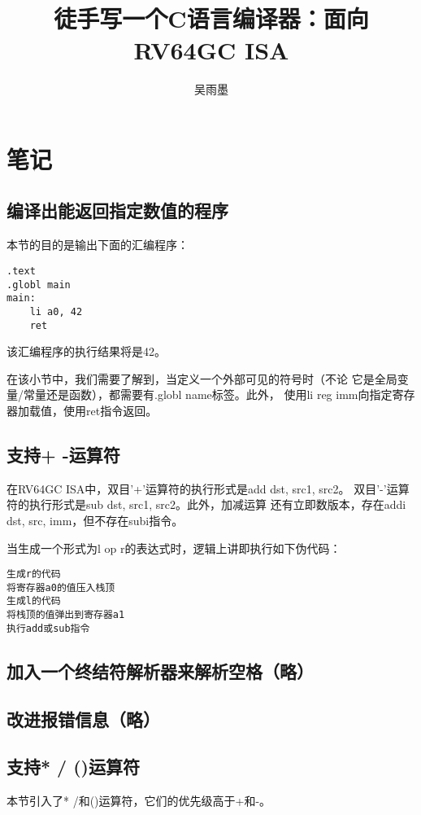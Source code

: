 \documentclass[a4paper, oneside, twocolumn]{ctexbook}
\begin{document}
\author{吴雨墨}
\title{徒手写一个C语言编译器：面向RV64GC ISA}
\maketitle

\tableofcontents

\chapter{笔记}
\section{编译出能返回指定数值的程序}
本节的目的是输出下面的汇编程序：

\begin{lstlisting}
.text
.globl main
main:
    li a0, 42
    ret
\end{lstlisting}  
该汇编程序的执行结果将是42。

在该小节中，我们需要了解到，当定义一个外部可见的符号时（不论
它是全局变量/常量还是函数），都需要有.globl name标签。此外，
使用li reg imm向指定寄存器加载值，使用ret指令返回。

\section{支持+ -运算符}
在RV64GC ISA中，双目'+'运算符的执行形式是add dst, src1, src2。
双目'-'运算符的执行形式是sub dst, src1, src2。此外，加减运算
还有立即数版本，存在addi dst, src, imm，但不存在subi指令。

当生成一个形式为l op r的表达式时，逻辑上讲即执行如下伪代码：
\begin{lstlisting}
生成r的代码
将寄存器a0的值压入栈顶
生成l的代码
将栈顶的值弹出到寄存器a1
执行add或sub指令
\end{lstlisting} 

\section{加入一个终结符解析器来解析空格（略）}
\section{改进报错信息（略）}
\section{支持* / ()运算符}
本节引入了* /和()运算符，它们的优先级高于+和-。
\end{document}
